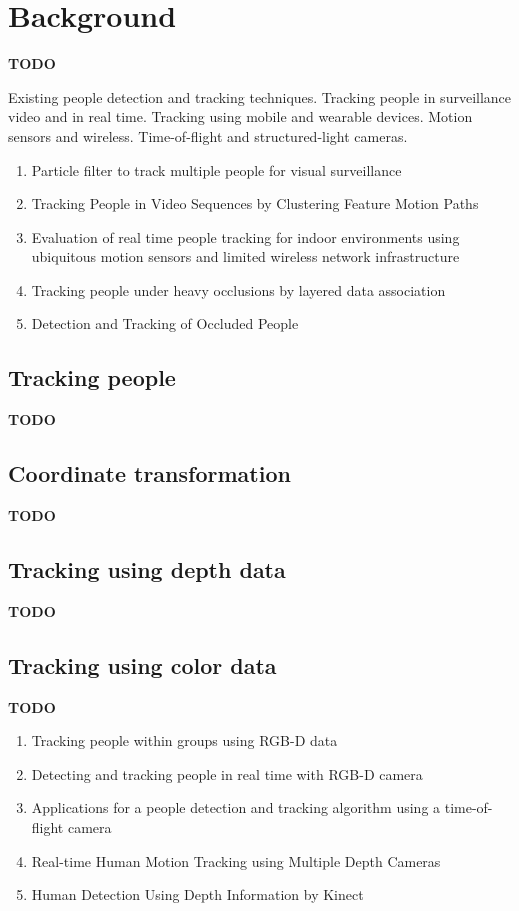 \section{Background}
\label{sec:background}

\textbf{TODO}

Existing people detection and tracking techniques. Tracking people in surveillance video and in real time. Tracking using mobile and wearable devices. Motion sensors and wireless. Time-of-flight and structured-light cameras.

\begin{enumerate}
  \item Particle filter to track multiple people for visual surveillance
  \item Tracking People in Video Sequences by Clustering Feature Motion Paths
  \item Evaluation of real time people tracking for indoor environments using ubiquitous motion sensors and limited wireless network infrastructure
  \item Tracking people under heavy occlusions by layered data association
  \item Detection and Tracking of Occluded People
\end{enumerate}

\subsection{Tracking people}

\textbf{TODO}

\subsection{Coordinate transformation}

\textbf{TODO}

\cite{eggert_four_algorithms}
\cite{horn_unit_quaternions}

\subsection{Tracking using depth data}

\textbf{TODO}

\subsection{Tracking using color data}

\textbf{TODO}

\begin{enumerate}
  \item Tracking people within groups using RGB-D data
  \item Detecting and tracking people in real time with RGB-D camera
  \item Applications for a people detection and tracking algorithm using a time-of-flight camera
  \item Real-time Human Motion Tracking using Multiple Depth Cameras
  \item Human Detection Using Depth Information by Kinect
\end{enumerate}
